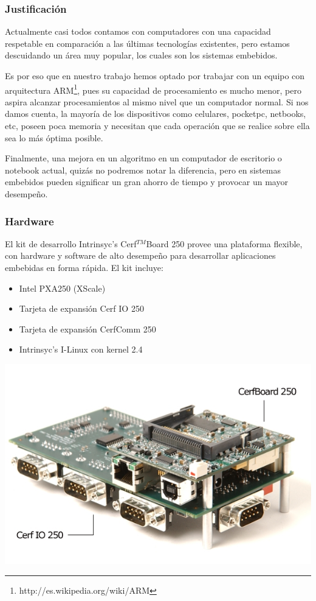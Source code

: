 \subsubsection{Justificación}

Actualmente casi todos contamos con computadores con una capacidad respetable en comparación a las últimas tecnologías existentes,
pero estamos descuidando un área muy popular, los cuales son los sistemas embebidos.

Es por eso que en nuestro trabajo hemos optado por trabajar con un equipo con arquitectura ARM\footnote{http://es.wikipedia.org/wiki/ARM},
pues su capacidad de procesamiento es mucho menor, pero aspira alcanzar procesamientos al mismo nivel que un computador normal.
Si nos damos cuenta, la mayoría de los dispositivos como celulares, pocketpc, netbooks, etc, poseen poca memoria y necesitan que cada operación que se realice
sobre ella sea lo más óptima posible.

Finalmente,
una mejora en un algoritmo en un computador de escritorio o notebook actual, quizás no podremos notar la diferencia,
pero en sistemas embebidos pueden significar un gran ahorro de tiempo y provocar un mayor desempeño.

\subsubsection{Hardware}

	El kit de desarrollo Intrinsyc's Cerf$^{TM}$Board 250 provee una plataforma 
flexible, con hardware y software de alto desempe\~no para desarrollar aplicaciones 
embebidas en forma r\'apida. El kit incluye:

\begin{itemize}
	\item Intel PXA250 (XScale)
	\item Tarjeta de expansi\'on Cerf IO 250
	\item Tarjeta de expansi\'on CerfComm 250
	\item Intrinsyc's I-Linux con kernel 2.4
\end{itemize}

\begin{center}
\includegraphics[scale=0.3]{images/board}
\end{center}

